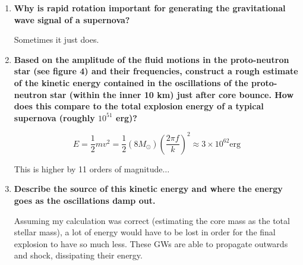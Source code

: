 \documentclass[11pt]{article}
\begin{document}
\begin{enumerate}
    \item \textbf{Why is rapid rotation important for generating
        the gravitational wave signal of a supernova?}

        Sometimes it just does.

    \item \textbf{Based on the amplitude of the fluid motions in the
        proto-neutron star (see figure 4) and their frequencies,
        construct a rough estimate of the kinetic energy contained
        in the oscillations of the proto-neutron star
        (within the inner 10 km) just after core bounce.
        How does this compare to the total explosion energy of a
        typical supernova (roughly $10^{51}$ erg)?}

        $$ E = \frac{1}{2}mv^2 = \frac{1}{2}(8M_{\odot})
        {\left( \frac{2\pi f}{k} \right)}^2
        \approx 3\times10^{62} \textrm{erg}$$

        This is higher by 11 orders of magnitude$\ldots$


    \item \textbf{Describe the source of this kinetic energy and where
        the energy goes as the oscillations damp out.}

        Assuming my calculation was correct (estimating the core mass as the
        total stellar mass), a lot of energy would have to be lost in order
        for the final explosion to have so much less. These GWs are able to
        propagate outwards and shock, dissipating their energy.
\end{enumerate}
\end{document}

